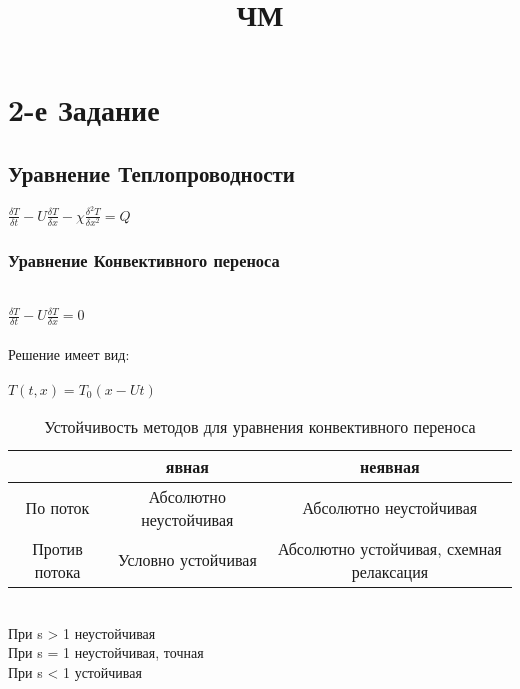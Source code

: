 \documentclass{article}
\title{ЧМ}
\begin{document}
\maketitle

\section{2-е Задание}

\subsection{Уравнение Теплопроводности}
$\frac{\delta T}{\delta t} - U\frac{\delta T}{\delta x} - \chi \frac{\delta^{2} T}{\delta x^{2}} = Q$\\
\subsubsection{Уравнение Конвективного переноса}\\
$\frac{\delta T}{\delta t} - U\frac{\delta T}{\delta x} = 0$\\\\
Решение имеет вид: \\\\
$T(t, x) = T_{0}(x - Ut)$
\begin{table}[h!]
    \centering
    \begin{tabular}{|c|c|c|}
        \hline
          & явная & неявная\\
         \hline
         По поток& Абсолютно неустойчивая  & Абсолютно неустойчивая \\
         \hline
         Против потока & Условно устойчивая& Абсолютно устойчивая, схемная релаксация\\
         \hline
    \end{tabular}
    \caption{Устойчивость методов для уравнения конвективного переноса}
    \label{tab:my_label}
\end{table}\\
При s > 1 неустойчивая\\
При s = 1 неустойчивая, точная\\
При s < 1 устойчивая\\
\end{document}

